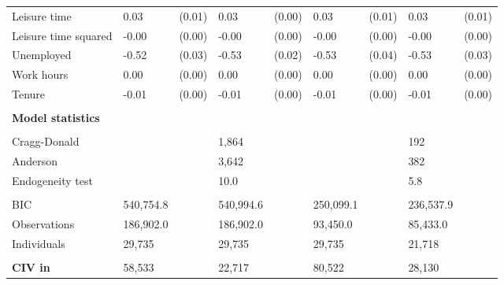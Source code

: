 {\begin{tabular}{l*{4}{lc}}
Leisure time        &        0.03\sym{***}&      (0.01)&        0.03\sym{***}&      (0.00)&        0.03\sym{***}&      (0.01)&        0.03\sym{***}&      (0.01)\\
Leisure time squared&       -0.00\sym{***}&      (0.00)&       -0.00\sym{***}&      (0.00)&       -0.00\sym{**} &      (0.00)&       -0.00\sym{***}&      (0.00)\\
Unemployed          &       -0.52\sym{***}&      (0.03)&       -0.53\sym{***}&      (0.02)&       -0.53\sym{***}&      (0.04)&       -0.53\sym{***}&      (0.03)\\
Work hours          &        0.00\sym{***}&      (0.00)&        0.00\sym{***}&      (0.00)&        0.00\sym{***}&      (0.00)&        0.00         &      (0.00)\\
Tenure              &       -0.01\sym{***}&      (0.00)&       -0.01\sym{***}&      (0.00)&       -0.01\sym{***}&      (0.00)&       -0.01\sym{***}&      (0.00)\\
\hline
\\ \textbf{Model statistics}&                     &            &                     &            &                     &            &                     &            \\
\hline \\ Cragg-Donald&                     &            &       1,864         &            &                     &            &         192         &            \\
Anderson            &                     &            &       3,642         &            &                     &            &         382         &            \\
Endogeneity test    &                     &            &        10.0         &            &                     &            &         5.8         &            \\
\\ BIC              &   540,754.8         &            &   540,994.6         &            &   250,099.1         &            &   236,537.9         &            \\
Observations        &   186,902.0         &            &   186,902.0         &            &    93,450.0         &            &    85,433.0         &            \\
Individuals         &      29,735         &            &      29,735         &            &      29,735         &            &      21,718         &            \\
\hline \\ \textbf{CIV in \EUR{}}&      58,533         &            &      22,717         &            &      80,522         &            &      28,130         &            \\
\hline\hline
\end{tabular}
}
